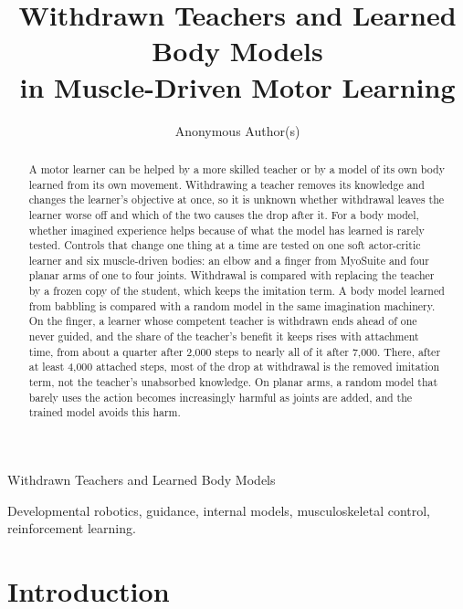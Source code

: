 \documentclass[journal]{IEEEtran}
\begin{document}
\title{Withdrawn Teachers and Learned Body Models\\ in Muscle-Driven Motor Learning}

\author{Anonymous Author(s)}

%
         {Withdrawn Teachers and Learned Body Models}

\maketitle

\begin{abstract}
A motor learner can be helped by a more skilled teacher or by a model of its
own body learned from its own movement. Withdrawing a teacher removes
its knowledge and changes the learner's objective at once, so it is unknown
whether withdrawal leaves the learner worse off and which of the two causes
the drop after it. For a body model, whether imagined
experience helps because of what the model has learned is rarely tested. Controls
that change one thing at a time are tested on one soft actor-critic
learner and six muscle-driven bodies: an elbow and a finger from MyoSuite and
four planar arms of one to four joints. Withdrawal is compared with
replacing the teacher by a frozen copy of the student, which keeps the imitation
term. A body model learned from
babbling is compared with a random model in the same imagination
machinery. On the finger, a learner whose competent teacher is withdrawn ends
ahead of one never guided, and the share of the teacher's benefit it keeps
rises with attachment time, from about a quarter after 2,000
steps to nearly all of it after 7,000. There, after at least 4,000
attached steps, most of the drop at withdrawal is the removed
imitation term, not the teacher's unabsorbed knowledge. On
planar arms, a random model that barely uses the
action becomes increasingly harmful as joints are added, and the trained
model avoids this harm.
\end{abstract}

\begin{IEEEkeywords}
Developmental robotics, guidance, internal models, musculoskeletal control,
reinforcement learning.
\end{IEEEkeywords}

\section{Introduction}
\end{document}
